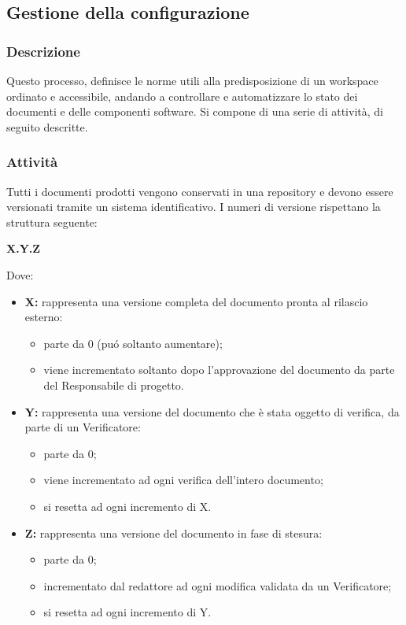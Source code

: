   \subsection{Gestione della configurazione}
    \subsubsection{Descrizione}
      Questo processo, definisce le norme utili alla predisposizione di un workspace ordinato e accessibile, andando a controllare e automatizzare lo stato dei documenti e delle componenti software. Si compone di una serie di attività, di seguito descritte.
    \subsubsection{Attività}
        Tutti i documenti prodotti vengono conservati in una repository e devono essere versionati tramite un sistema identificativo. I numeri di versione rispettano la struttura seguente:
        \begin{center}
          \textbf{X.Y.Z}
        \end{center}
        Dove:
        \begin{itemize}
          \item \textbf{X:} rappresenta una versione completa del documento pronta al rilascio esterno:
            \begin{itemize}
              \item parte da 0 (puó soltanto aumentare);
              \item viene incrementato soltanto dopo l'approvazione del documento da parte del Responsabile di progetto.
            \end{itemize}
          \item \textbf{Y:} rappresenta una versione del documento che è stata oggetto di verifica, da parte di un Verificatore:
            \begin{itemize}
              \item parte da 0;
              \item viene incrementato ad ogni verifica dell'intero documento;
              \item si resetta ad ogni incremento di X.
            \end{itemize}
          \item \textbf{Z:} rappresenta una versione del documento in fase di stesura:
            \begin{itemize}
              \item parte da 0;
              \item incrementato dal redattore ad ogni modifica validata da un Verificatore;
              \item si resetta ad ogni incremento di Y.
            \end{itemize}
        \end{itemize}

